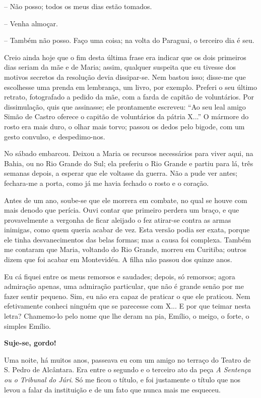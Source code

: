 -- Não posso; todos os meus dias estão tomados.

-- Venha almoçar.

-- Também não posso. Faço uma coisa; na volta do Paraguai, o terceiro
dia é seu.

Creio ainda hoje que o fim desta última frase era indicar que os dois
primeiros dias seriam da mãe e de Maria; assim, qualquer suspeita que eu
tivesse dos motivos secretos da resolução devia dissipar-se. Nem bastou
isso; disse-me que escolhesse uma prenda em lembrança, um livro, por
exemplo. Preferi o seu último retrato, fotografado a pedido da mãe, com
a farda de capitão de voluntários. Por dissimulação, quis que assinasse;
ele prontamente escreveu: ``Ao seu leal amigo Simão de Castro oferece o
capitão de voluntários da pátria X...'' O mármore do rosto era mais
duro, o olhar mais torvo; passou os dedos pelo bigode, com um gesto
convulso, e despedimo-nos.

No sábado embarcou. Deixou a Maria os recursos necessários para viver
aqui, na Bahia, ou no Rio Grande do Sul; ela preferiu o Rio Grande e
partiu para lá, três semanas depois, a esperar que ele voltasse da
guerra. Não a pude ver antes; fechara-me a porta, como já me havia
fechado o rosto e o coração.

Antes de um ano, soube-se que ele morrera em combate, no qual se houve
com mais denodo que perícia. Ouvi contar que primeiro perdera um braço,
e que provavelmente a vergonha de ficar aleijado o fez atirar-se contra
as armas inimigas, como quem queria acabar de vez. Esta versão podia ser
exata, porque ele tinha desvanecimentos das belas formas; mas a causa
foi complexa. Também me contaram que Maria, voltando do Rio Grande,
morreu em Curitiba; outros dizem que foi acabar em Montevidéu. A filha
não passou dos quinze anos.

Eu cá fiquei entre os meus remorsos e saudades; depois, só remorsos;
agora admiração apenas, uma admiração particular, que não é grande senão
por me fazer sentir pequeno. Sim, eu não era capaz de praticar o que ele
praticou. Nem efetivamente conheci ninguém que se parecesse com X... E
por que teimar nesta letra? Chamemo-lo pelo nome que lhe deram na pia,
Emílio, o meigo, o forte, o simples Emílio.

\textbf{Suje-se, gordo!}

Uma noite, há muitos anos, passeava eu com um amigo no terraço do Teatro
de S. Pedro de Alcântara. Era entre o segundo e o terceiro ato da peça
\emph{A Sentença ou o Tribunal do Júri}. Só me ficou o título, e foi
justamente o título que nos levou a falar da instituição e de um fato
que nunca mais me esqueceu.

